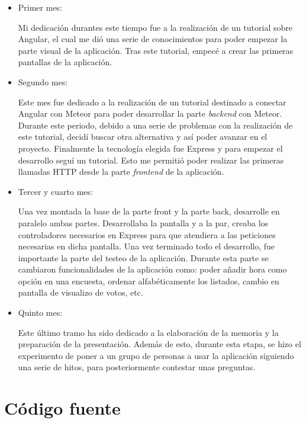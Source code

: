 \documentclass[a4paper, 12pt]{book}
\begin{document}
\begin{itemize}
\item Primer mes:

 Mi dedicaci\'on durantes este tiempo fue a la realizaci\'on de un tutorial sobre Angular\cite{TutorialAngular}, el cual me di\'o una serie de conocimientos para poder empezar la parte visual de la aplicaci\'on. Tras este tutorial, empec\'e a crear las primeras pantallas de la aplicaci\'on.

 \item Segundo mes: 

Este mes fue dedicado a la realizaci\'on de un tutorial destinado a conectar Angular con Meteor para poder desarrollar la parte \emph{backend} con Meteor. Durante este periodo, debido a una serie de problemas con la realizaci\'on de este tutorial, decid\'i buscar otra alternativa y as\'i poder avanzar en el proyecto. Finalmente la tecnolog\'ia elegida fue Express y para empezar el desarrollo segu\'i un tutorial\cite{TutorialExpress}. Esto me permiti\'o poder realizar las primeras llamadas HTTP desde la parte \emph{frontend} de la aplicaci\'on.

\item Tercer y cuarto mes: 

Una vez montada la base de la parte front y la parte back, desarrolle en paralelo ambas partes. Desarrollaba la pantalla y a la par,  creaba los controladores necesarios en Express para que atendiera a las peticiones necesarias en dicha pantalla. Una vez terminado todo el desarrollo, fue importante la parte del testeo de la aplicaci\'on. Durante esta parte se cambiaron funcionalidades de la aplicaci\'on como: poder a\~nadir hora como opci\'on en una encuesta, ordenar alfab\'eticamente los listados, cambio en pantalla de visualizo de votos, etc.

\item Quinto mes: 

Este \'ultimo tramo ha sido dedicado a la elaboraci\'on de la memoria y la preparaci\'on de la presentaci\'on. Adem\'as de esto, durante esta etapa, se hizo el experimento de poner a un grupo de personas a usar la aplicaci\'on siguiendo una serie de hitos, para posteriormente contestar unas preguntas.

\end{itemize}

\section{C\'odigo fuente}
\label{sec:codigo-fuente}
\end{document}
